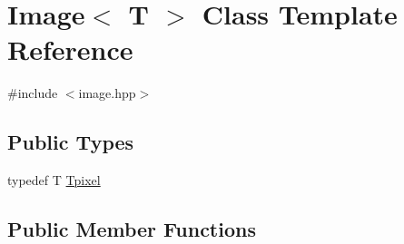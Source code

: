 \hypertarget{classImage}{}\section{Image$<$ T $>$ Class Template Reference}
\label{classImage}


{\ttfamily \#include $<$image.\+hpp$>$}

\subsection*{Public Types}
\begin{DoxyCompactItemize}
\item 
typedef T \hyperlink{classImage_a532d996f3d6ea53501de88a35f0bba5f}{Tpixel}
\end{DoxyCompactItemize}
\subsection*{Public Member Functions}
